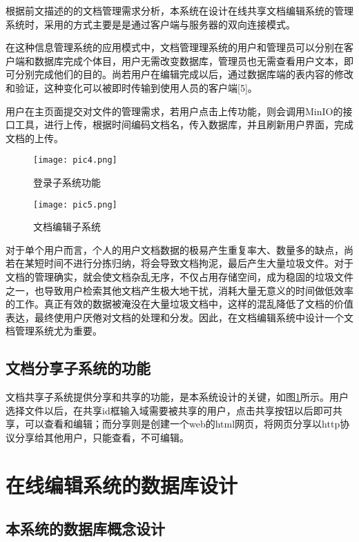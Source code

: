 \documentclass[forprint]{software}
\begin{document}
根据前文描述的的文档管理需求分析，本系统在设计在线共享文档编辑系统的管理系统时，采用的方式主要是是通过客户端与服务器的双向连接模式。

在这种信息管理系统的应用模式中，文档管理理系统的用户和管理员可以分别在客户端和数据库完成个体目，用户无需改变数据库，管理员也无需查看用户文本，即可分别完成他们的目的。尚若用户在编辑完成以后，通过数据库端的表内容的修改和验证，这种变化可以被即时传输到使用人员的客户端[5]。

用户在主页面提交对文件的管理需求，若用户点击上传功能，则会调用MinIO的接口工具，进行上传，根据时间编码文档名，传入数据库，并且刷新用户界面，完成文档的上传。

\begin{figure}[ht]
	\centering
	\begin{minipage}[t]{0.45\linewidth}
		\centering
		\texttt{[image: pic4.png]}
		\caption{登录子系统功能}
		\label{fig:4}
	\end{minipage}%
	\begin{minipage}[t]{0.45\linewidth}
		\centering
		\texttt{[image: pic5.png]}
		\caption{文档编辑子系统}
		\label{fig:5}
	\end{minipage}%
\end{figure}

对于单个用户而言，个人的用户文档数据的极易产生重复率大、数量多的缺点，尚若在某短时间不进行分拣归纳，将会导致文档拘泥，最后产生大量垃圾文件。对于文档的管理确实，就会使文档杂乱无序，不仅占用存储空间，成为稳固的垃圾文件之一，也导致用户检索其他文档产生极大地干扰，消耗大量无意义的时间做低效率的工作。真正有效的数据被淹没在大量垃圾文档中，这样的混乱降低了文档的价值表达，最终使用户厌倦对文档的处理和分发。因此，在文档编辑系统中设计一个文档管理系统尤为重要。

\section{文档分享子系统的功能}

文档共享子系统提供分享和共享的功能，是本系统设计的关键，如图\ref{fig:5}所示。用户选择文件以后，在共享id框输入域需要被共享的用户，点击共享按钮以后即可共享，可以查看和编辑；而分享则是创建一个web的html网页，将网页分享以http协议分享给其他用户，只能查看，不可编辑。

\chapter{在线编辑系统的数据库设计}

\section{本系统的数据库概念设计}
\end{document}

